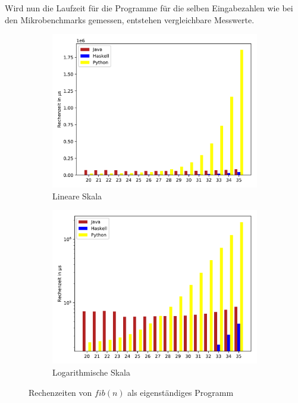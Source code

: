 \documentclass[11pt, parskip=half]{scrartcl}       %
\begin{document}
Wird nun die Laufzeit für die Programme für die selben Eingabezahlen wie bei den Mikrobenchmarks gemessen, entstehen vergleichbare Messwerte.

\begin{figure}[h]
  \centering
  \begin{subfigure}{0.5\textwidth}
    \centering
    \includegraphics[width=\textwidth]{src/linear-standalone.pdf}
    \caption{Lineare Skala}
    \label{fig:bench-lin}
  \end{subfigure}%
  \begin{subfigure}{0.5\textwidth}
    \centering
    \includegraphics[width=\textwidth]{src/log-standalone.pdf}
    \caption{Logarithmische Skala}
    \label{fig:bench-log}
  \end{subfigure}
  \caption{Rechenzeiten von $fib(n)$ als eigenständiges Programm}
  \label{fig:bench}
\end{figure}
\end{document}
